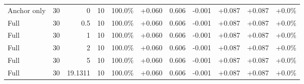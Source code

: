 \begin{table}[htbp]
\begin{tabular}{lrrrccccccc}
Anchor only & 30 & 0 & 10 & 100.0\% & +0.060 & 0.606 & -0.001 & +0.087 & +0.087 & +0.0\% \\
Full & 30 & 0.5 & 10 & 100.0\% & +0.060 & 0.606 & -0.001 & +0.087 & +0.087 & +0.0\% \\
Full & 30 & 1 & 10 & 100.0\% & +0.060 & 0.606 & -0.001 & +0.087 & +0.087 & +0.0\% \\
Full & 30 & 2 & 10 & 100.0\% & +0.060 & 0.606 & -0.001 & +0.087 & +0.087 & +0.0\% \\
Full & 30 & 5 & 10 & 100.0\% & +0.060 & 0.606 & -0.001 & +0.087 & +0.087 & +0.0\% \\
Full & 30 & 19.1311 & 10 & 100.0\% & +0.060 & 0.606 & -0.001 & +0.087 & +0.087 & +0.0\% \\
\bottomrule
\end{tabular}
\end{table}